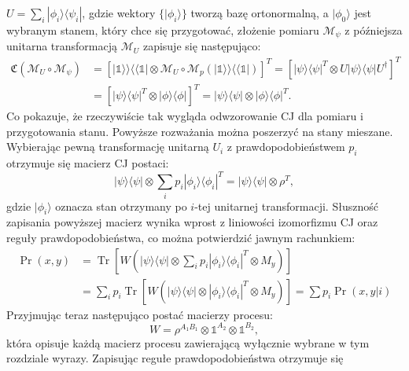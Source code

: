 \documentclass[10pt]{article} %
\DeclareMathOperator{\Trs}{Tr}
\newcommand{\Ket}[1]{|#1\rangle}
\newcommand{\Bra}[1]{\langle#1|}
\newcommand{\BBra}[1]{\langle\langle#1|}
\newcommand{\KKet}[1]{|#1\rangle\rangle}
\newcommand{\KP}{\Ket{\psi}}
\newcommand{\BP}{\Bra{\psi}}
\newcommand{\I}{\mathbb{1}}
\newcommand{\MCJ}{\mathfrak{C}}
\begin{document}
$U = \sum_i \Ket{\phi_i}\Bra{\psi_i}$, gdzie wektory $\{ \Ket{\phi_i} \}$ tworzą bazę ortonormalną, a $\Ket{\phi_0}$ jest wybranym stanem, który chce się przygotować, złożenie pomiaru $\mathcal{M}_\psi$ z późniejsza unitarna transformacją $\mathcal{M}_U$ zapisuje się następująco:
\begin{equation}
\begin{split}
\MCJ(\mathcal{M}_U \circ \mathcal{M}_\psi) &= \left[ \KKet{\I}\BBra{\I} \otimes \mathcal{M}_U \circ \mathcal{M}_p\left(\KKet{\I}\BBra{\I}\right)\right]^T = \left[\Ket{\psi}\Bra{\psi}^T \otimes U \Ket{\psi}\Bra{\psi} U^\dag \right]^T\\ &= \left[ \Ket{\psi}\Bra{\psi}^T \otimes \Ket{\phi}\Bra{\phi} \right]^T = \Ket{\psi}\Bra{\psi} \otimes \Ket{\phi}\Bra{\phi}^T.
\end{split}
\end{equation}
Co pokazuje, że rzeczywiście tak wygląda odwzorowanie CJ dla pomiaru i przygotowania stanu. Powyższe rozważania można poszerzyć na stany mieszane. Wybierając pewną transformację unitarną $U_i$ z prawdopodobieństwem $p_i$ otrzymuje się macierz CJ postaci:
\begin{equation}
\Ket{\psi}\Bra{\psi} \otimes \sum_i p_i \Ket{\phi_i}\Bra{\phi_i}^T = \Ket{\psi}\Bra{\psi} \otimes \rho^T,
\end{equation}
gdzie $\Ket{\phi_i}$ oznacza stan otrzymany po $i$-tej unitarnej transformacji. Słuszność zapisania powyższej macierz wynika wprost z liniowości izomorfizmu CJ oraz reguły prawdopodobieństwa, co można potwierdzić jawnym rachunkiem:
\begin{equation}
\begin{split}
\Pr(x,y) &= \Trs\left[ W \left( \KP\BP \otimes \sum_i p_i \Ket{\phi_i}\Bra{\phi_i}^T \otimes M_y\right)\right]\\& = \sum_i p_i \Trs\left[ W \left( \KP\BP \otimes \Ket{\phi_i}\Bra{\phi_i}^T \otimes M_y\right)\right] = \sum p_i \Pr(x,y|i)
\end{split}
\end{equation}
Przyjmując teraz następująco postać macierzy procesu:
\begin{equation}
W = \rho^{A_1B_1} \otimes \I^{A_2} \otimes \I^{B_2},
\end{equation} która opisuje każdą macierz procesu zawierającą wyłącznie wybrane w tym rozdziale wyrazy. Zapisując regułe prawdopodobieństwa otrzymuje się
\end{document}
